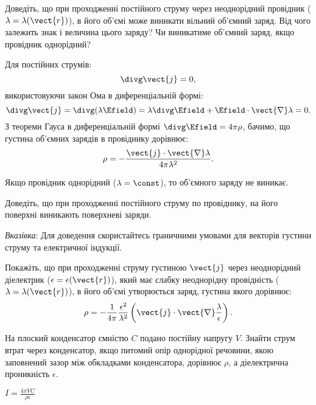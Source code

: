 \begin{problem}
Доведіть, що при проходженні постійного струму через неоднорідний провідник ($\lambda = \lambda(\vect{r})$), в його об'ємі може виникати вільний об'ємний  заряд. Від чого залежить знак і величина цього заряду? Чи виникатиме об'ємний заряд, якщо провідник однорідний?
\begin{solution}
	Для постійних струмів:
	\begin{equation}
		\divg\vect{j} = 0,
	\end{equation}
	використовуючи закон Ома в диференціальній формі:
	\begin{equation}
		\divg\vect{j} = \divg(\lambda\Efield) = \lambda\divg\Efield + \Efield\cdot\vect{\nabla}\lambda = 0.
	\end{equation}
	З теореми Гауса в диференціальній формі $\divg\Efield = 4\pi\rho$, бачимо, що густина об'ємних зарядів в провіднику дорівнює:
	\begin{equation}
		\rho = - \frac{\vect{j}\cdot\vect{\nabla}\lambda}{4\pi\lambda^2}.
	\end{equation}

	Якщо провідник однорідний ($\lambda = \const$), то об'ємного заряду не виникає.
\end{solution}
\end{problem}

\begin{problem}
Доведіть, що при проходженні постійного струму по провіднику, на його поверхні виникають поверхневі заряди.

{\small \emph{Вказівка}: Для доведення скористайтесь граничними умовами для векторів густини струму та електричної індукції.}
\end{problem}

\begin{problem}
    Покажіть, що при проходженні струму густиною $\vect{j}$ через неоднорідний діелектрик ($\epsilon = \epsilon(\vect{r})$), який має слабку неоднорідну провідність ($\lambda = \lambda(\vect{r})$), в його об'ємі утворюється заряд, густина якого дорівнює:
	\[
		\rho = - \frac{1}{4\pi}\frac{\epsilon^2}{\lambda^2}\left( \vect{j}\cdot\vect{\nabla}\frac{\lambda}{\epsilon}\right) .
	\]
\end{problem}


\begin{problem}
На плоский конденсатор ємністю $C$ подано постійну напругу $V$. Знайти струм втрат через конденсатор, якщо питомий опір однорідної речовини, якою заповнений зазор між обкладками конденсатора, дорівнює $\rho$, а діелектрична проникність $\epsilon$.
\begin{solution}
	$ I = \frac{4\pi VC}{\rho \epsilon} $
\end{solution}
\end{problem}

